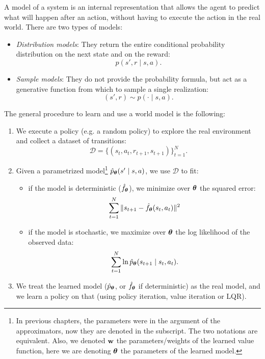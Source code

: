 \documentclass[10pt, a4paper]{report}
\begin{document}
A model of a system is an internal representation that allows the agent to predict what will happen after an action, without having to execute the action in the real world. There are two types of models:\begin{itemize}
    \item \textit{Distribution models}: They return the entire conditional probability distribution on the next state and on the reward:\begin{equation}
        p(s',r\mid s,a).
    \end{equation}
    \item \textit{Sample models}: They do not provide the probability formula, but act as a generative function from which to sample a single realization:\begin{equation}
        (s',r)\sim p(\cdot\mid s,a).
    \end{equation}
\end{itemize}
The general procedure to learn and use a world model is the following:\begin{enumerate}
    \item We execute a policy (e.g. a random policy) to explore the real environment and collect a dataset of transitions:\begin{equation}
        \mathcal D=\{(s_t,a_t,r_{t+1},s_{t+1})\}_{t=1}^N.
    \end{equation}
    \item Given a parametrized model\footnote{
        In previous chapters, the parameters were in the argument of the approximators, now they are denoted in the subscript. The two notations are equivalent.  Also, we denoted ${\mathbf{w}}$ the parameters/weights of the learned value function, here we are denoting ${\boldsymbol{\theta}}$ the parameters of the learned model.
    } $\hat p_{\boldsymbol{\theta}}(s'\mid s,a)$, we use $\mathcal{ D}$ to fit:\begin{itemize}
        \item if the model is deterministic ($\hat f_{\boldsymbol{\theta}}$), we minimize over ${\boldsymbol{\theta}}$ the squared error: $$\sum_{t=1}^N\|s_{t+1} - \hat f_{\boldsymbol{\theta}}(s_t,a_t)\|^2$$
        \item if the model is stochastic, we maximize over ${\boldsymbol{\theta}}$ the log likelihood of the observed data:$$
        \sum_{t=1}^N \ln \hat{p}_{\boldsymbol{\theta}}(s_{t+1} \mid s_t, a_t).
        $$
    \end{itemize}
    \item We treat the learned model ($\hat p_{\boldsymbol{\theta}}$, or $\hat f_{\boldsymbol{\theta}}$ if deterministic) as the real model, and we learn a policy on that (using policy iteration, value iteration or LQR).
\end{enumerate}
\end{document}
